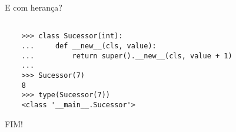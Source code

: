 \documentclass[utf8]{beamer}
\begin{document}
\begin{frame}[fragile]{E com herança?}

  \begin{verbatim}

    >>> class Sucessor(int):
    ...     def __new__(cls, value):
    ...         return super().__new__(cls, value + 1)
    ...
    >>> Sucessor(7)
    8
    >>> type(Sucessor(7))
    <class '__main__.Sucessor'>

  \end{verbatim}
\end{frame}


\begin{frame}
  \begin{center}\fontsize{5cm}{2.5cm}\selectfont
    FIM!
  \end{center}
\end{frame}
\end{document}
